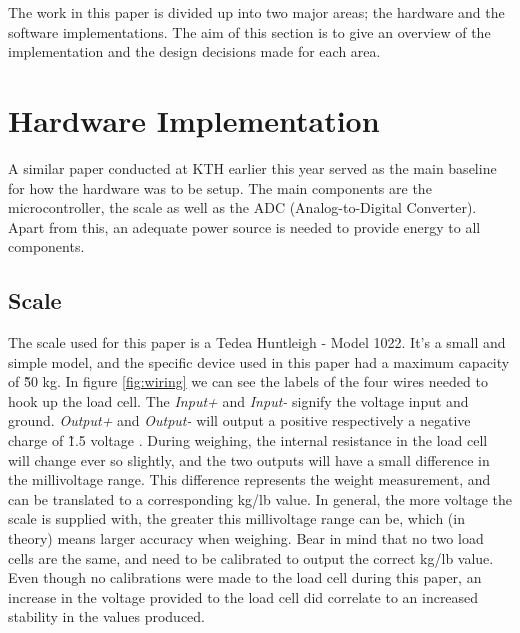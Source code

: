 




The work in this paper is divided up into two major areas; the hardware and the software implementations. The aim of this section is to give an overview of the implementation and the design decisions made for each area.

\section{Hardware Implementation}

A similar paper conducted at KTH earlier this year served as the main baseline for how the hardware was to be setup.\cite{hospital} The main components are the microcontroller, the scale as well as the ADC (Analog-to-Digital Converter). Apart from this, an adequate power source is needed to provide energy to all components. 


\subsection{Scale}
The scale used for this paper is a Tedea Huntleigh - Model 1022. It's a small and simple model, and the specific device used in this paper had a maximum capacity of \~50 kg.\cite{load-cell-data} In figure \ref{fig:wiring} we can see the labels of the four wires needed to hook up the load cell. The \textit{Input+} and \textit{Input-} signify the voltage input and ground. \cite{load-cell-spec} \textit{Output+} and \textit{Output-} will output a positive respectively a negative charge of \~1.5 voltage . During weighing, the internal resistance in the load cell will change ever so slightly, and the two outputs will have a small difference in the millivoltage range. This difference represents the weight measurement, and can be translated to a corresponding kg/lb value. In general, the more voltage the scale is supplied with, the greater this millivoltage range can be, which (in theory) means larger accuracy when weighing. Bear in mind that no two load cells are the same, and need to be calibrated to output the correct kg/lb value. Even though no calibrations were made to the load cell during this paper, an increase in the voltage provided to the load cell did correlate to an increased stability in the values produced. 

